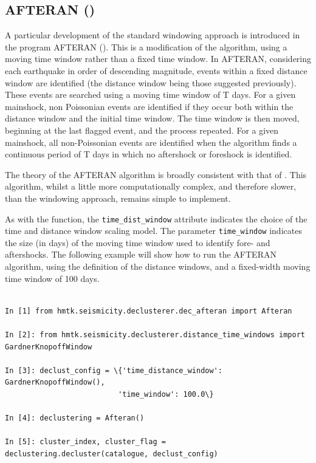 \subsection{AFTERAN (\cite{Musson1999PSHABalkan})}

A particular development of the standard windowing approach is introduced in the program AFTERAN (\cite{Musson1999PSHABalkan}). This is a modification of the \cite{GardnerKnopoff1974} algorithm, using a moving time window rather than a fixed time window. In AFTERAN, considering each earthquake in order of descending magnitude, events within a fixed distance window are identified (the distance window being those suggested previously). These events are searched using a moving time window of T days. For a given mainshock, non Poissonian events are identified if they occur both within the distance window and the initial time window. The time window is then moved, beginning at the last flagged event, and the process repeated. For a given mainshock, all non-Poissonian events are identified when the algorithm finds a continuous period of T days in which no aftershock or foreshock is identified. 

The theory of the AFTERAN algorithm is broadly consistent with that of \cite{GardnerKnopoff1974}. This algorithm, whilst a little more computationally complex, and therefore slower, than the \cite{GardnerKnopoff1974} windowing approach, remains simple to implement. 

As with the \cite{GardnerKnopoff1974} function, the \verb=time_dist_window= attribute indicates the choice of the time and distance window scaling model. The parameter \verb=time_window= indicates the size (in days) of the moving time window used to identify fore- and aftershocks. The following example will show how to run the AFTERAN algorithm, using the  \cite{GardnerKnopoff1974} definition of the distance windows, and a fixed-width moving time window of 100 days.

  
\begin{Verbatim}[frame=single, commandchars=\\\{\}, fontsize=\scriptsize, samepage=true]

In [1] from hmtk.seismicity.declusterer.dec_afteran import Afteran

In [2]: from hmtk.seismicity.declusterer.distance_time_windows import GardnerKnopoffWindow   
 
In [3]: declust_config = \{'time_distance_window': GardnerKnopoffWindow(),
                          'time_window': 100.0\} 

In [4]: declustering = Afteran()

In [5]: cluster_index, cluster_flag = declustering.decluster(catalogue, declust_config)

\end{Verbatim}

